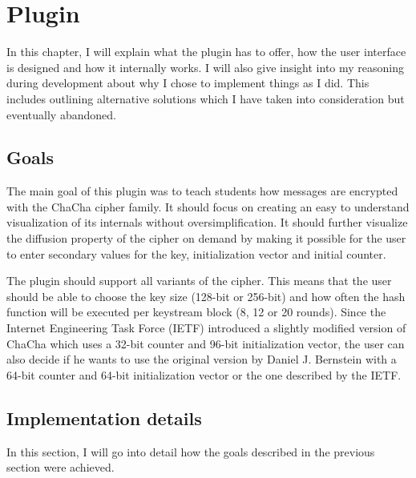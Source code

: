 %

\chapter{Plugin}
\label{chap:Plugin}

In this chapter, I will explain what the plugin has to offer, how the user interface is designed and how it internally works. I will also give insight into my reasoning during development about why I chose to implement things as I did. This includes outlining alternative solutions which I have taken into consideration but eventually abandoned.

\section{Goals}
\label{sec:goals}

The main goal of this plugin was to teach students how messages are encrypted with the ChaCha cipher family. It should focus on creating an easy to understand visualization of its internals without oversimplification.
It should further visualize the diffusion property of the cipher on demand by making it possible for the user to enter secondary values for the key, initialization vector and initial counter.

The plugin should support all variants of the cipher. This means that the user should be able to choose the key size (128-bit or 256-bit) and how often the hash function will be executed per keystream block (8, 12 or 20 rounds). 
Since the Internet Engineering Task Force (IETF) introduced a slightly modified version of ChaCha which uses a 32-bit counter and 96-bit initialization vector, the user can also decide if he wants to use the original version by Daniel J. Bernstein with a 64-bit counter and 64-bit initialization vector or the one described by the IETF.

\section{Implementation details}
\label{sec:implementationDetails}

In this section, I will go into detail how the goals described in the previous section were achieved.

\par

